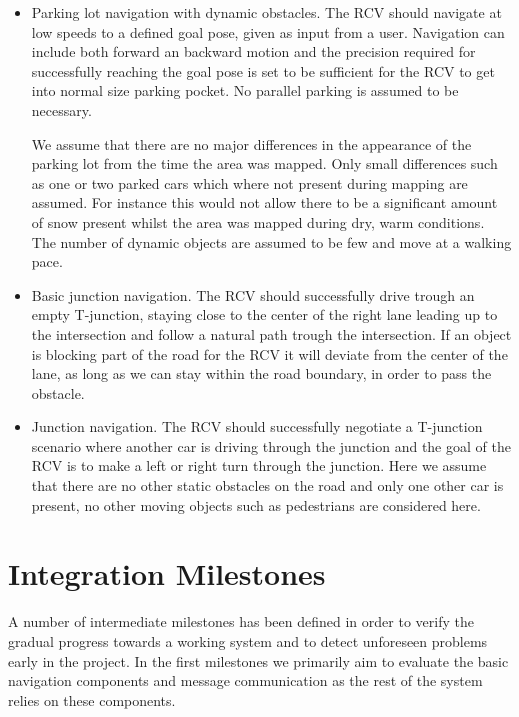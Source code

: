 \documentclass[11pt,a4paper]{article}
\begin{document}
\begin{itemize}


\item Parking lot navigation with dynamic obstacles. The RCV should navigate at low speeds 
  to a defined goal pose, given as input from a user. Navigation
can include both forward an backward motion and the precision
required for successfully reaching the goal pose is set to be
sufficient for the RCV to get into normal size parking pocket. No
parallel parking is assumed to be necessary.

We assume that there are no major differences in the appearance of the
parking lot from the time the area was mapped. Only small differences
such as one or two parked cars which where not present during mapping
are assumed. For instance this would not allow there to be a
significant amount of snow present whilst the area was mapped during
dry, warm conditions. The number of dynamic objects are assumed to be few and move at a 
walking pace.

\item Basic junction navigation. The RCV should successfully drive
  trough an empty T-junction, staying close to the center of the right
  lane leading up to the intersection and follow a natural path trough the intersection.
  If an object is blocking part of the road for the RCV it will deviate from the center of the
  lane, as long as we can stay within the road boundary, in order to pass the obstacle.

\item Junction navigation. The RCV should successfully negotiate a
  T-junction scenario where another car is driving through the
  junction and the goal of the RCV is to make a left or right turn
  through the junction. Here we assume that there are no
  other static obstacles on the road and only one other car is present, no other moving
objects such as pedestrians are considered here.

\end{itemize}

\section{Integration Milestones}
A number of intermediate milestones has been defined in order to verify the gradual progress towards a working system and to detect unforeseen problems early in the project.
In the first milestones we primarily aim to evaluate the basic navigation components
and message communication as the rest of the system relies on these components.
\end{document}
